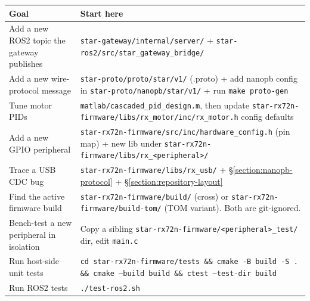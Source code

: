 \begin{center}
\begin{tabular}{|p{6.5cm}|p{8.0cm}|}
\hline
\textbf{Goal}                                                       & \textbf{Start here}                                                                                                                            \\
\hline
Add a new ROS2 topic the gateway publishes                           & \texttt{star-gateway/internal/server/} + \texttt{star-ros2/src/star\_gateway\_bridge/}                                                          \\
Add a new wire-protocol message                                      & \texttt{star-proto/proto/star/v1/} (.proto) + add nanopb config in \texttt{star-proto/nanopb/star/v1/} + run \texttt{make proto-gen}             \\
Tune motor PIDs                                                      & \texttt{matlab/cascaded\_pid\_design.m}, then update \texttt{star-rx72n-firmware/libs/rx\_motor/inc/rx\_motor.h} config defaults                \\
Add a new GPIO peripheral                                             & \texttt{star-rx72n-firmware/src/inc/hardware\_config.h} (pin map) + new lib under \texttt{star-rx72n-firmware/libs/rx\_<peripheral>/}            \\
Trace a USB CDC bug                                                   & \texttt{star-rx72n-firmware/libs/rx\_usb/} + \S\ref{section:nanopb-protocol} + \S\ref{section:repository-layout}                                  \\
Find the active firmware build                                        & \texttt{star-rx72n-firmware/build/} (cross) or \texttt{star-rx72n-firmware/build-tom/} (TOM variant). Both are git-ignored.                       \\
Bench-test a new peripheral in isolation                              & Copy a sibling \texttt{star-rx72n-firmware/<peripheral>\_test/} dir, edit \texttt{main.c}                                                        \\
Run host-side unit tests                                              & \texttt{cd star-rx72n-firmware/tests \&\& cmake -B build -S . \&\& cmake --build build \&\& ctest --test-dir build}                                \\
Run ROS2 tests                                                        & \texttt{./test-ros2.sh}                                                                                                                          \\

\end{tabular}
\end{center}
